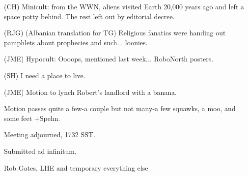 \documentclass[12pt]{article}
\begin{document}
(CH) Minicult: from the WWN, aliens visited Earth 20,000 years ago and left a space potty behind. The rest left out by editorial decree.

(RJG) (Albanian translation for TG) Religious fanatics were handing out pamphlets about prophecies and such... loonies.

(JME) Hypocult: Oooops, mentioned last week... RoboNorth posters.

(SH) I need a place to live.

(JME) Motion to lynch Robert's landlord with a banana.

Motion passes quite a few-a couple but not many-a few squawks, a moo, and some feet +Spehn.

\vspace{12pt}

\noindent
Meeting adjourned, 1732 SST.

\vspace{18pt}

\centerline{Submitted ad infinitum,}
\centerline{Rob Gates, LHE and temporary everything else}
\end{document}

